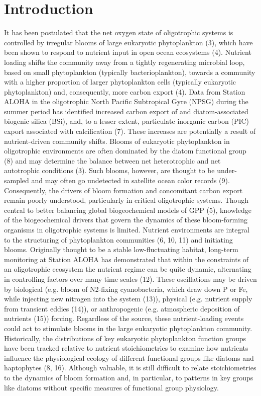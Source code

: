 \section{Introduction}
It has been postulated that the net oxygen state of oligotrophic systems is controlled by irregular blooms of large eukaryotic phytoplankton (3), which have been shown to respond to nutrient input in open ocean ecosystems (4). Nutrient loading shifts the community away from a tightly regenerating microbial loop, based on small phytoplankton (typically bacterioplankton), towards a community with a higher proportion of larger phytoplankton cells (typically eukaryotic phytoplankton) and, consequently, more carbon export (4). Data from Station ALOHA in the oligotrophic North Pacific Subtropical Gyre (NPSG) during the summer period has identified increased carbon export of and diatom-associated biogenic silica (BSi), and, to a lesser extent, particulate inorganic carbon (PIC) export associated with calcification (7). These increases are potentially a result of nutrient-driven community shifts. Blooms of eukaryotic phytoplankton in oligotrophic environments are often dominated by the diatom functional group (8) and may determine the balance between net heterotrophic and net autotrophic conditions (3). Such blooms, however, are thought to be under-sampled and may often go undetected in satellite ocean color records (9). Consequently, the drivers of bloom formation and concomitant carbon export remain poorly understood, particularly in critical oligotrophic systems. 
Though central to better balancing global biogeochemical models of GPP (5), knowledge of the biogeochemical drivers that govern the dynamics of these bloom-forming organisms in oligotrophic systems is limited. Nutrient environments are integral to the structuring of phytoplankton communities (6, 10, 11) and initiating blooms. Originally thought to be a stable low-fluctuating habitat, long-term monitoring at Station ALOHA has demonstrated that within the constraints of an oligotrophic ecosystem the nutrient regime can be quite dynamic, alternating in controlling factors over many time scales (12). These oscillations may be driven by biological (e.g. bloom of N2-fixing cyanobacteria, which draw down P or Fe, while injecting new nitrogen into the system (13)), physical (e.g. nutrient supply from transient eddies (14)), or anthropogenic (e.g. atmospheric deposition of nutrients (15)) forcing.  Regardless of the source, these nutrient-loading events could act to stimulate blooms in the large eukaryotic phytoplankton community.  Historically, the distributions of key eukaryotic phytoplankton function groups have been tracked relative to nutrient stoichiometries to examine how nutrients influence the physiological ecology of different functional groups like diatoms and haptophytes (8, 16). Although valuable, it is still difficult to relate stoichiometries to the dynamics of bloom formation and, in particular, to patterns in key groups like diatoms without specific measures of functional group physiology.  
